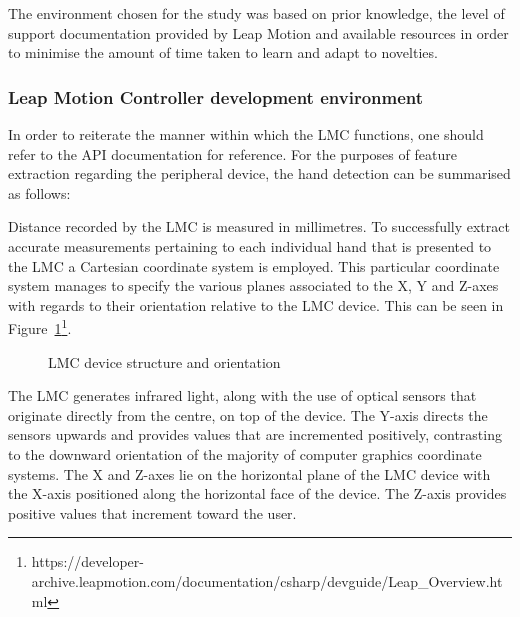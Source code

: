 The environment chosen for the study was based on prior knowledge, the level of support documentation provided by Leap Motion and available resources in order to minimise the amount of time taken to learn and adapt to novelties. 

\subsubsection{Leap Motion Controller development environment}

In order to reiterate the manner within which the LMC functions, one should refer to the API documentation for reference. For the purposes of feature extraction regarding the peripheral device, the hand detection can be summarised as follows:

Distance recorded by the LMC is measured in millimetres. 
To successfully extract accurate measurements pertaining to each individual hand that is presented to the LMC a Cartesian coordinate system is employed. 	This particular coordinate system manages to specify the various planes associated to the X, Y and Z-axes with regards to their orientation relative to the LMC device. This can be seen in Figure~\ref{fig:LMC device structure and orientation}\footnote{https://developer-archive.leapmotion.com/documentation/csharp/devguide/Leap_Overview.html}. 

    
    \begin{figure}[htbp!] 
    \centering    
    
    \caption[LMC device structure and orientation]{LMC device structure and orientation}
    \label{fig:LMC device structure and orientation}
    \end{figure}


The LMC generates infrared light, along with the use of optical sensors that originate directly from the centre, on top of the device. The Y-axis directs the sensors upwards and provides values that are incremented positively, contrasting to the downward orientation of the majority of computer graphics coordinate systems. The X and Z-axes lie on the horizontal plane of the LMC device with the X-axis positioned along the horizontal face of the device. The Z-axis provides positive values that increment toward the user. 

